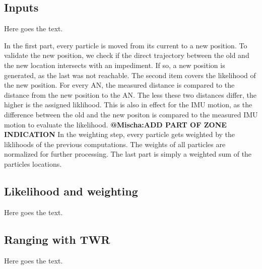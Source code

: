 \subsection{Inputs}
Here goes the text.

In the first part, every particle is moved from its current to a new position. To validate the new position, we check if the direct trajectory between the old and the new location intersects with an impediment. If so, a new position is generated, as the last was not reachable.
The second item covers the likelihood of the new position. For every AN, the measured distance is compared to the distance from the new position to the AN. The less these two distances differ, the higher is the assigned liklihood. This is also in effect for the IMU motion, as the difference between the old and the new positon is compared to the measured IMU motion to evaluate the likelihood. \textbf{@Mischa:ADD PART OF ZONE INDICATION} %
In the weighting step, every particle gets weighted by the liklihoods of the previous computations. The weights of all particles are normalized for further processing.
The last part is simply a weighted sum of the particles locations.

\subsection{Likelihood and weighting}
Here goes the text.


\subsection{Ranging with TWR}
Here goes the text.